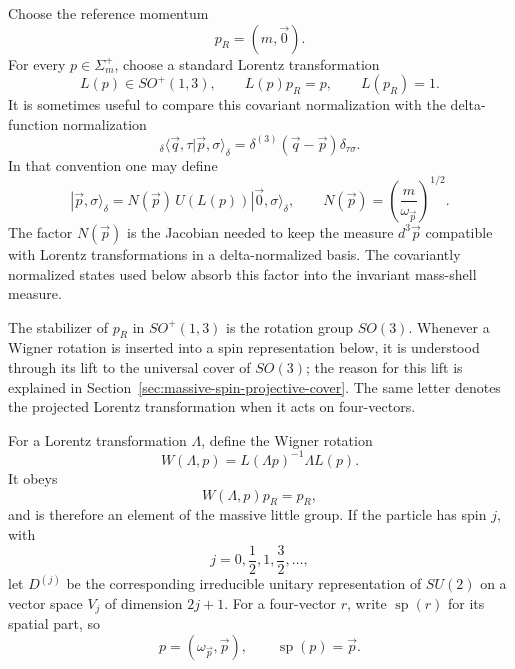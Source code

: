 \begin{definition}
\label{def:massive-standard-rest-momentum-normalization}
Choose the reference momentum
\[
  p_R=(m,\vec0).
\]
For every \(p\in\Sigma_m^+\), choose a standard Lorentz transformation
\[
  L(p)\in SO^+(1,3),
  \qquad
  L(p)p_R=p,
  \qquad
  L(p_R)=1 .
\]
It is sometimes useful to compare this covariant normalization with the
delta-function normalization
\[
  {}_\delta\langle \vec q,\tau|\vec p,\sigma\rangle_\delta
  =
  \delta^{(3)}(\vec q-\vec p)\delta_{\tau\sigma}.
\]
In that convention one may define
\[
  |\vec p,\sigma\rangle_\delta
  =
  N(\vec p)\,U(L(p))|\vec0,\sigma\rangle_\delta ,
  \qquad
  N(\vec p)=\left(\frac{m}{\omega_{\vec p}}\right)^{1/2}.
\]
The factor \(N(\vec p)\) is the Jacobian needed to keep the measure
\(d^3\vec p\) compatible with Lorentz transformations in a
delta-normalized basis. The covariantly normalized states used below absorb
this factor into the invariant mass-shell measure.
\end{definition}

\begin{definition}
\label{def:massive-wigner-rotation}
The stabilizer of \(p_R\) in \(SO^+(1,3)\) is the rotation group \(SO(3)\).
Whenever a Wigner rotation is inserted into a spin representation below, it is
understood through its lift to the universal cover of \(SO(3)\); the reason for
this lift is explained in
Section~\ref{sec:massive-spin-projective-cover}.  The same letter denotes the
projected Lorentz transformation when it acts on four-vectors.

For a Lorentz transformation \(\Lambda\), define the Wigner rotation
\[
  W(\Lambda,p)
  =
  L(\Lambda p)^{-1}\Lambda L(p).
\]
It obeys
\[
  W(\Lambda,p)p_R=p_R,
\]
and is therefore an element of the massive little group. If the particle has
spin \(j\), with
\[
  j=0,\frac12,1,\frac32,\ldots,
\]
let \(D^{(j)}\) be the corresponding irreducible unitary representation of
\(SU(2)\) on a vector space \(V_j\) of dimension \(2j+1\).  For a four-vector
\(r\), write \(\operatorname{sp}(r)\) for its spatial part, so
\[
  p=(\omega_{\vec p},\vec p),
  \qquad
  \operatorname{sp}(p)=\vec p .
\]
\end{definition}

